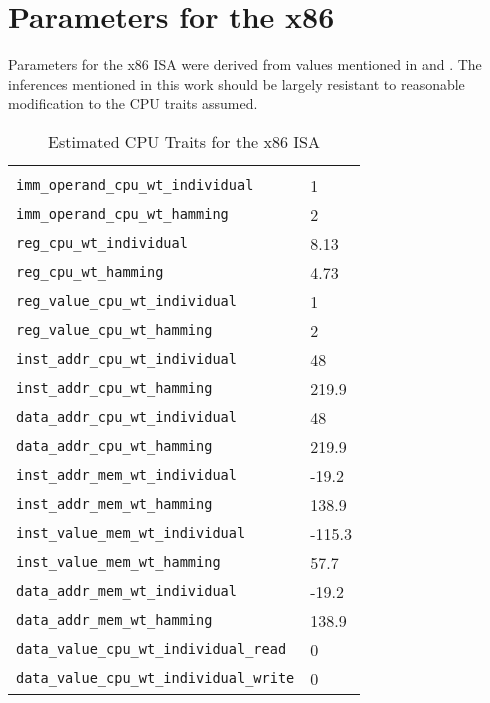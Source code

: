 \section{Parameters for the x86} \label{sec:trait-values}

Parameters for the x86 ISA were derived from values mentioned in
\cite{steinke} and \cite{lee}.  The inferences mentioned in this work
should be largely resistant to reasonable modification to the CPU
traits assumed.

\begin{longtable}{l|l}
  \caption{Estimated CPU Traits for the x86 ISA} \\

  \hline \\

  \texttt{imm\_operand\_cpu\_wt\_individual} & 1 \\
  \texttt{imm\_operand\_cpu\_wt\_hamming} & 2 \\

  \texttt{reg\_cpu\_wt\_individual} & 8.13 \\
  \texttt{reg\_cpu\_wt\_hamming} & 4.73 \\

  \texttt{reg\_value\_cpu\_wt\_individual} & 1 \\
  \texttt{reg\_value\_cpu\_wt\_hamming} & 2 \\

  \texttt{inst\_addr\_cpu\_wt\_individual} & 48 \\
  \texttt{inst\_addr\_cpu\_wt\_hamming} & 219.9 \\

  \texttt{data\_addr\_cpu\_wt\_individual} & 48 \\
  \texttt{data\_addr\_cpu\_wt\_hamming} & 219.9 \\

  \texttt{inst\_addr\_mem\_wt\_individual} & -19.2 \\
  \texttt{inst\_addr\_mem\_wt\_hamming} & 138.9 \\

  \texttt{inst\_value\_mem\_wt\_individual} & -115.3 \\
  \texttt{inst\_value\_mem\_wt\_hamming} & 57.7 \\

  \texttt{data\_addr\_mem\_wt\_individual} & -19.2 \\
  \texttt{data\_addr\_mem\_wt\_hamming} & 138.9 \\

  \texttt{data\_value\_cpu\_wt\_individual\_read} & 0 \\
  \texttt{data\_value\_cpu\_wt\_individual\_write} & 0 \\


\end{longtable}
